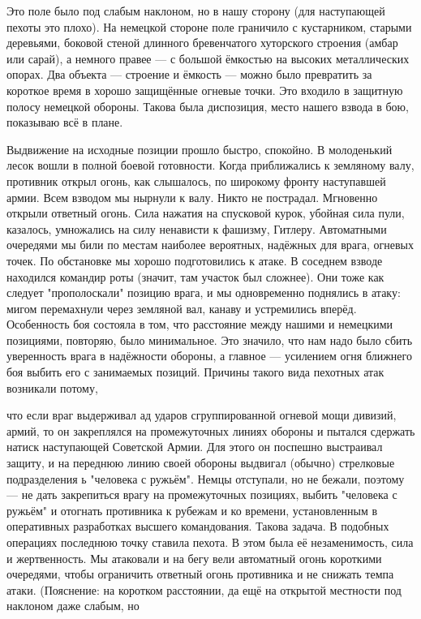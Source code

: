 \label{6-1}
Это поле было под слабым наклоном, но в нашу сторону (для наступающей пехоты это плохо). На немецкой стороне поле граничило с кустарником, старыми деревьями, боковой стеной длинного бревенчатого хуторского строения (амбар или сарай), а немного правее — с большой ёмкостью на высоких металлических опорах. Два объекта — строение и ёмкость — можно было превратить за короткое время в хорошо защищённые огневые точки. Это входило в защитную полосу немецкой обороны. Такова была диспозиция, место нашего взвода в бою, показываю всё в плане.

\label{7-1}
Выдвижение на исходные позиции прошло быстро, спокойно. В молоденький лесок вошли в полной боевой готовности. Когда приближались к земляному валу, противник открыл огонь, как слышалось, по широкому фронту наступавшей армии. Всем взводом мы нырнули к валу. Никто не пострадал. Мгновенно открыли ответный огонь. Сила нажатия на спусковой курок, убойная сила пули, казалось, умножались на силу ненависти к фашизму, Гитлеру. Автоматными очередями мы били по местам наиболее вероятных, надёжных для врага, огневых точек. По обстановке мы хорошо подготовились к атаке. В соседнем взводе находился командир роты (значит, там участок был сложнее). Они тоже как следует "прополоскали" позицию врага, и мы одновременно поднялись в атаку: мигом перемахнули через земляной вал, канаву и устремились вперёд. Особенность боя состояла в том, что расстояние между нашими и немецкими позициями, повторяю, было минимальное. Это значило, что нам надо было сбить уверенность врага в надёжности обороны, а главное — усилением огня ближнего боя выбить его с занимаемых позиций. Причины такого вида пехотных атак возникали потому,


\label{8-1}

что если враг выдерживал ад ударов сгруппированной огневой мощи дивизий, армий, то он закреплялся на промежуточных линиях обороны и пытался сдержать натиск наступающей Советской Армии. Для этого он поспешно выстраивал защиту, и на переднюю линию своей обороны выдвигал (обычно) стрелковые подразделения ь "человека с ружьём". Немцы отступали, но не бежали, поэтому — не дать закрепиться врагу на промежуточных позициях, выбить "человека с ружьём" и отогнать противника к рубежам и ко времени, установленным в оперативных разработках высшего командования. Такова задача. В подобных операциях последнюю точку ставила пехота. В этом была её незаменимость, сила и жертвенность. 
Мы атаковали и на бегу вели автоматный огонь короткими очередями, чтобы ограничить ответный огонь противника и не снижать темпа атаки. (Пояснение: на коротком расстоянии, да ещё на открытой местности под наклоном даже слабым, но


